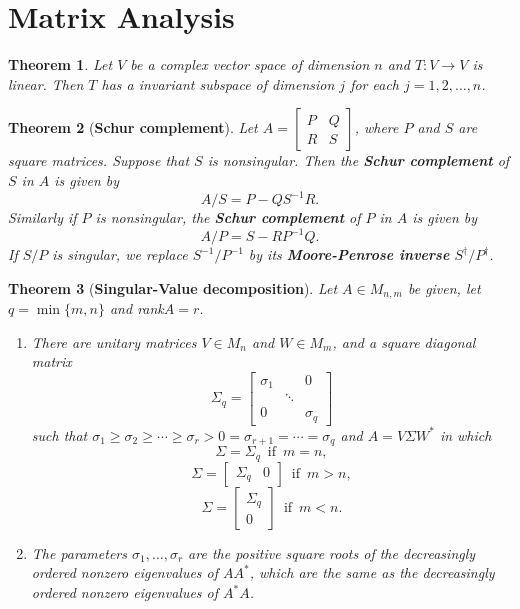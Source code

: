 \documentclass[answers, a4paper, 12pt]{exam}
\newtheorem{theorem}{Theorem}[section]
\begin{document}
\thispagestyle{empty}
\tableofcontents
\renewcommand{\labelenumi}{(\alph{enumi})}
\newpage
\section{Matrix Analysis}
\begin{theorem}
    Let $V$ be a complex vector space of dimension $n$ and $T:V\to V$ is linear. Then $T$ has a invariant subspace of dimension $j$ for each $j=1,2,\ldots,n$.
\end{theorem}
\begin{theorem}[\textbf{Schur complement}]
    Let $A=\begin{bmatrix}
        P & Q \\
        R & S
    \end{bmatrix}$, where $P$ and $S$ are square matrices. Suppose that $S$ is nonsingular. Then the \textbf{Schur complement} of $S$ in $A$ is given by $$A/S=P-QS^{-1}R.$$
    Similarly if $P$ is nonsingular, the \textbf{Schur complement} of $P$ in $A$ is given by $$A/P=S-RP^{-1}Q.$$ If $S/ P$ is singular, we replace $S^{-1}/ P^{-1}$ by its \textbf{Moore-Penrose inverse} $S^{\dagger}/P^{\dagger}$.
\end{theorem}
\begin{theorem}[\textbf{Singular-Value decomposition}]
    Let $A\in M_{n, m}$ be given, let $q=\min\{m,n\}$ and rank$A=r$.
    \begin{enumerate}
        \item There are unitary matrices $V\in M_n$ and $W\in M_m$, and a square diagonal matrix
        $$\Sigma_{q}=\begin{bmatrix}
            \sigma_1 & & 0\\
            & \ddots & \\
            0 & & \sigma_q 
        \end{bmatrix}$$
        such that $\sigma_1\geq\sigma_2\geq\cdots\geq\sigma_r>0=\sigma_{r+1}=\cdots=\sigma_q$ and $A=V\Sigma W^*$ in which
        $$\Sigma=\Sigma_q\,\,\,\text{if}\,\,\,m=n,$$
        $$\Sigma=\begin{bmatrix}
            \Sigma_q & 0
        \end{bmatrix} \,\,\,\text{if}\,\,\,m>n,$$
        $$\Sigma=\begin{bmatrix}
            \Sigma_q \\ 0
        \end{bmatrix}\,\,\,\text{if}\,\,\,m<n.$$
        \item The parameters $\sigma_1,\ldots,\sigma_r$ are the positive square roots of the decreasingly ordered nonzero eigenvalues of $AA^*$, which are the same as the decreasingly ordered nonzero eigenvalues of $A^*A$.
    \end{enumerate}
\end{theorem}
\end{document}
